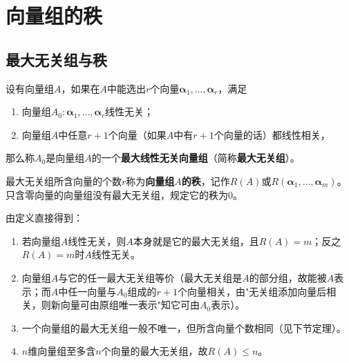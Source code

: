 

\section{向量组的秩}

\subsection{最大无关组与秩}
\begin{definition}[最大线性无关向量组]
设有向量组$A$，如果在$A$中能选出$r$个向量$\boldsymbol{\alpha}_1,\dots,\boldsymbol{\alpha}_r$，满足
\begin{enumerate}
    \item[(i)] 向量组$A_0:\boldsymbol{\alpha}_1,\dots,\boldsymbol{\alpha}_r$线性无关；
    \item[(ii)] 向量组$A$中任意$r+1$个向量（如果$A$中有$r+1$个向量的话）都线性相关，
\end{enumerate}
那么称$A_0$是向量组$A$的一个\textbf{最大线性无关向量组}（简称\textbf{最大无关组}）。
\end{definition}

\begin{definition}[向量组的秩]
最大无关组所含向量的个数$r$称为\textbf{向量组$A$的秩}，记作$R(A)$或$R(\boldsymbol{\alpha}_1,\dots,\boldsymbol{\alpha}_m)$。只含零向量的向量组没有最大无关组，规定它的秩为$0$。
\end{definition}

由定义直接得到：
\begin{enumerate}
    \item 若向量组$A$线性无关，则$A$本身就是它的最大无关组，且$R(A)=m$；反之$R(A)=m$时$A$线性无关。
    \item 向量组$A$与它的任一最大无关组等价（最大无关组是$A$的部分组，故能被$A$表示；而$A$中任一向量与$A_0$组成的$r+1$个向量相关，由"无关组添加向量后相关，则新向量可由原组唯一表示"知它可由$A_0$表示）。
    \item 一个向量组的最大无关组一般不唯一，但所含向量个数相同（见下节定理）。
    \item $n$维向量组至多含$n$个向量的最大无关组，故$R(A)\le n$。
\end{enumerate}

